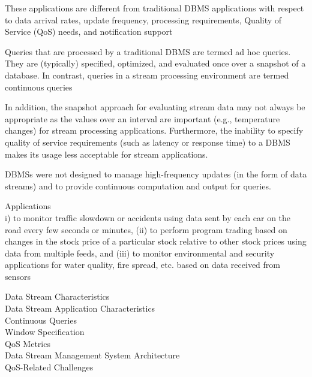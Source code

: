 These applications are different from traditional DBMS applications with respect
to data arrival rates, update frequency, processing requirements, Quality of
Service (QoS) needs, and notification support

Queries that are processed by a traditional DBMS are termed ad hoc queries. They
are (typically) specified, optimized, and evaluated once over a snapshot of a
database. In contrast, queries in a stream processing environment are termed
continuous queries

In addition, the snapshot approach for evaluating stream data may not always be
appropriate as the values over an interval are important (e.g., temperature
changes) for stream processing applications. Furthermore, the inability to
specify quality of service requirements (such as latency or response time) to a
DBMS makes its usage less acceptable for stream applications.

DBMSs were not designed to manage high-frequency updates (in the form of data
streams) and to provide continuous computation and output for queries.

Applications\cite{chakravarthy2009stream}\\ i) to monitor traffic slowdown or
accidents using data sent by each car on the road every few seconds or minutes,
(ii) to perform program trading based on changes in the stock price of a
particular stock relative to other stock prices using data from multiple feeds,
and (iii) to monitor environmental and security applications for water
quality, fire spread, etc. based on data received from sensors

Data Stream Characteristics\cite{chakravarthy2009stream}\\


Data Stream Application Characteristics\cite{chakravarthy2009stream}\\


Continuous Queries\cite{chakravarthy2009stream}\\


Window Specification\cite{chakravarthy2009stream}\\


QoS Metrics\cite{chakravarthy2009stream}\\


Data Stream Management System Architecture\cite{chakravarthy2009stream}\\


QoS-Related Challenges\cite{chakravarthy2009stream}\\


